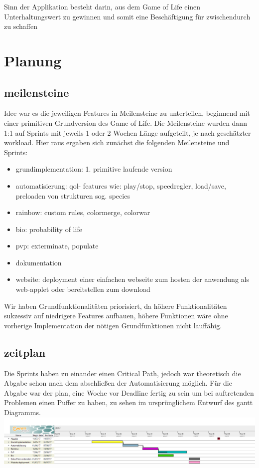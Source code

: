 \documentclass[12pt]{article}
\theoremstyle{plain}
\begin{document}
Sinn der Applikation besteht darin, aus dem Game of Life einen Unterhaltungswert zu gewinnen und somit eine Beschäftigung für zwischendurch zu schaffen

\section{Planung}

\subsection{meilensteine}
Idee war es die jeweiligen Features in Meilensteine zu unterteilen, beginnend mit einer primitiven Grundversion des Game of Life. Die Meilensteine wurden dann 1:1 auf Sprints mit jeweils 1 oder 2 Wochen Länge aufgeteilt, je nach geschätzter workload.  Hier raus ergaben sich zunächst die folgenden Meilensteine und Sprints:
\begin{itemize}
\item
grundimplementation: 1. primitive laufende version
\item
automatisierung: qol- features wie: play/stop, speedregler, load/save, preloaden von strukturen sog. species
\item
rainbow: custom rules, colormerge, colorwar
\item
bio: probability of life
\item
pvp: exterminate, populate
\item
dokumentation
\item
website: deployment einer einfachen webseite zum hosten der anwendung als web-applet oder bereitstellen zum download
\end{itemize}

Wir haben Grundfunktionalitäten priorisiert, da höhere Funktionalitäten sukzessiv auf niedrigere Features aufbauen,
höhere Funktionen wäre ohne vorherige Implementation der nötigen Grundfunktionen nicht lauffähig.

\subsection{zeitplan}
Die Sprints haben zu einander einen Critical Path, jedoch war theoretisch die Abgabe schon nach dem abschließen der Automatisierung möglich.
Für die Abgabe war der plan, eine Woche vor Deadline fertig zu sein um bei auftretenden Problemen einen Puffer zu haben, zu sehen im ursprünglichem Entwurf des gantt Diagramms.
\newline
\includegraphics[scale=0.3]{images/ganttdep.png}
\newline
\end{document}
